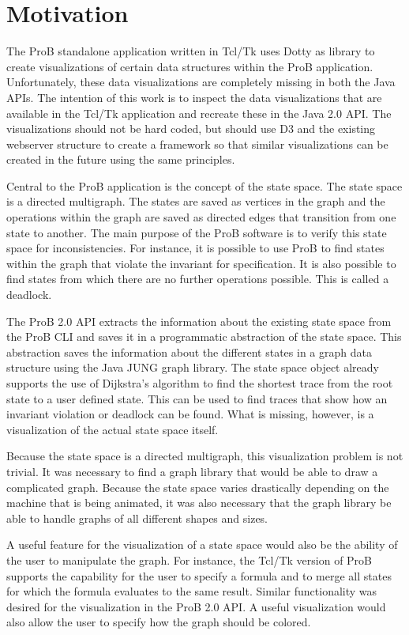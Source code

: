 \section{Motivation}

The ProB standalone application written in Tcl/Tk uses Dotty as library to create visualizations of certain data structures within the ProB application. Unfortunately, these data visualizations are completely missing in both the Java APIs. The intention of this work is to inspect the data visualizations that are available in the Tcl/Tk application and recreate these in the Java 2.0 API. The visualizations should not be hard coded, but should use D3 and the existing webserver structure to create a framework so that similar visualizations can be created in the future using the same principles.

Central to the ProB application is the concept of the state space. The state space is a directed multigraph. The states are saved as vertices in the graph and the operations within the graph are saved as directed edges that transition from one state to another. The main purpose of the ProB software is to verify this state space for inconsistencies. For instance, it is possible to use ProB to find states within the graph that violate the invariant for specification. It is also possible to find states from which there are no further operations possible. This is called a deadlock.

The ProB 2.0 API extracts the information about the existing state space from the ProB CLI and saves it in a programmatic abstraction of the state space. This abstraction saves the information about the different states in a graph data structure using the Java JUNG graph library. The state space object already supports the use of Dijkstra's algorithm to find the shortest trace from the root state to a user defined state. This can be used to find traces that show how an invariant violation or deadlock can be found. What is missing, however, is a visualization of the actual state space itself.

Because the state space is a directed multigraph, this visualization problem is not trivial. It was necessary to find a graph library that would be able to draw a complicated graph. Because the state space varies drastically depending on the machine that is being animated, it was also necessary that the graph library be able to handle graphs of all different shapes and sizes.

A useful feature for the visualization of a state space would also be the ability of the user to manipulate the graph. For instance, the Tcl/Tk version of ProB supports the capability for the user to specify a formula and to merge all states for which the formula evaluates to the same result. Similar functionality was desired for the visualization in the ProB 2.0 API. A useful visualization would also allow the user to specify how the graph should be colored.

